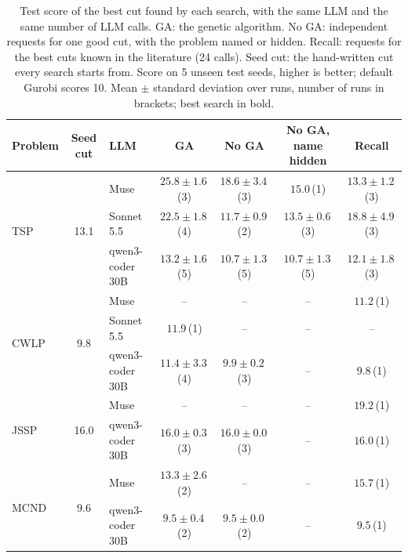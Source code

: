\begin{table}[t]
\centering
\small
\caption{Test score of the best cut found by each search, with the same LLM and the same number of LLM calls. GA: the genetic algorithm. No GA: independent requests for one good cut, with the problem named or hidden. Recall: requests for the best cuts known in the literature (24 calls). Seed cut: the hand-written cut every search starts from. Score on 5 unseen test seeds, higher is better; default Gurobi scores 10. Mean $\pm$ standard deviation over runs, number of runs in brackets; best search in bold.}
\label{tab:ga-vs-controls}
\begin{tabular}{@{}l c l cccc@{}}
\toprule
Problem & Seed cut & LLM & GA & No GA & No GA, name hidden & Recall \\
\midrule
\multirow{3}{*}{TSP} & \multirow{3}{*}{13.1} & Muse & $\mathbf{25.8} \pm 1.6$\,{\scriptsize(3)} & $18.6 \pm 3.4$\,{\scriptsize(3)} & $15.0$\,{\scriptsize(1)} & $13.3 \pm 1.2$\,{\scriptsize(3)} \\
 &  & Sonnet 5.5 & $\mathbf{22.5} \pm 1.8$\,{\scriptsize(4)} & $11.7 \pm 0.9$\,{\scriptsize(2)} & $13.5 \pm 0.6$\,{\scriptsize(3)} & $18.8 \pm 4.9$\,{\scriptsize(3)} \\
 &  & qwen3-coder 30B & $\mathbf{13.2} \pm 1.6$\,{\scriptsize(5)} & $10.7 \pm 1.3$\,{\scriptsize(5)} & $10.7 \pm 1.3$\,{\scriptsize(5)} & $12.1 \pm 1.8$\,{\scriptsize(3)} \\
\midrule
\multirow{3}{*}{CWLP} & \multirow{3}{*}{9.8} & Muse & -- & -- & -- & $\mathbf{11.2}$\,{\scriptsize(1)} \\
 &  & Sonnet 5.5 & $\mathbf{11.9}$\,{\scriptsize(1)} & -- & -- & -- \\
 &  & qwen3-coder 30B & $\mathbf{11.4} \pm 3.3$\,{\scriptsize(4)} & $9.9 \pm 0.2$\,{\scriptsize(3)} & -- & $9.8$\,{\scriptsize(1)} \\
\midrule
\multirow{2}{*}{JSSP} & \multirow{2}{*}{16.0} & Muse & -- & -- & -- & $\mathbf{19.2}$\,{\scriptsize(1)} \\
 &  & qwen3-coder 30B & $\mathbf{16.0} \pm 0.3$\,{\scriptsize(3)} & $16.0 \pm 0.0$\,{\scriptsize(3)} & -- & $16.0$\,{\scriptsize(1)} \\
\midrule
\multirow{2}{*}{MCND} & \multirow{2}{*}{9.6} & Muse & $13.3 \pm 2.6$\,{\scriptsize(2)} & -- & -- & $\mathbf{15.7}$\,{\scriptsize(1)} \\
 &  & qwen3-coder 30B & $\mathbf{9.5} \pm 0.4$\,{\scriptsize(2)} & $9.5 \pm 0.0$\,{\scriptsize(2)} & -- & $9.5$\,{\scriptsize(1)} \\

\end{tabular}
\end{table}
